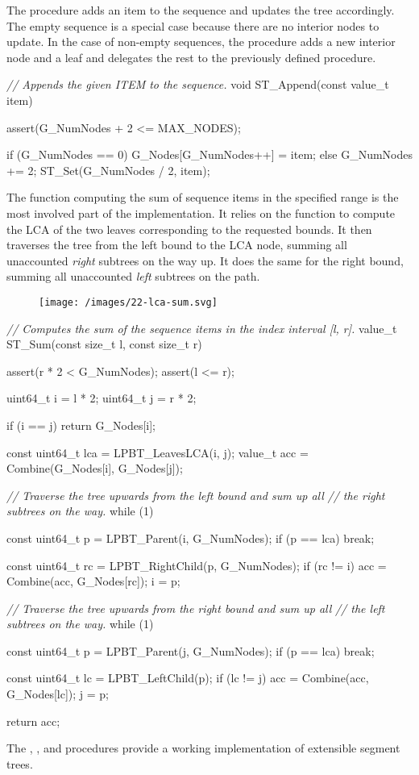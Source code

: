 \documentclass{article}
\begin{document}
The  procedure adds an item to the sequence and updates the tree accordingly.
The empty sequence is a special case because there are no interior nodes to update.
In the case of non-empty sequences, the procedure adds a new interior node and a leaf and delegates the rest to the previously defined  procedure.

\begin{code}[c]
\emph{// Appends the given ITEM to the sequence.}
void ST_Append(const value_t item) {
    assert(G_NumNodes + 2 <= MAX_NODES);

    if (G_NumNodes == 0) {
        G_Nodes[G_NumNodes++] = item;
    } else {
        G_NumNodes += 2;
        ST_Set(G_NumNodes / 2, item);
    }
}
\end{code}

The  function computing the sum of sequence items in the specified range is the most involved part of the implementation.
It relies on the  function to compute the LCA of the two leaves corresponding to the requested bounds.
It then traverses the tree from the left bound to the LCA node, summing all unaccounted \emph{right} subtrees on the way up.
It does the same for the right bound, summing all unaccounted \emph{left} subtrees on the path.

\begin{figure}[grayscale-diagram]
  \texttt{[image: /images/22-lca-sum.svg]}
\end{figure}

\begin{code}[c]
\emph{// Computes the sum of the sequence items in the index interval [l, r].}
value_t ST_Sum(const size_t l, const size_t r) {
    assert(r * 2 < G_NumNodes);
    assert(l <= r);

    uint64_t i = l * 2;
    uint64_t j = r * 2;

    if (i == j) return G_Nodes[i];

    const uint64_t lca = LPBT_LeavesLCA(i, j);
    value_t acc = Combine(G_Nodes[i], G_Nodes[j]);

    \emph{// Traverse the tree upwards from the left bound and sum up all}
    \emph{// the right subtrees on the way.}
    while (1) {
        const uint64_t p = LPBT_Parent(i, G_NumNodes);
        if (p == lca) break;

        const uint64_t rc = LPBT_RightChild(p, G_NumNodes);
        if (rc != i) acc = Combine(acc, G_Nodes[rc]);
        i = p;
    }
    \emph{// Traverse the tree upwards from the right bound and sum up all}
    \emph{// the left subtrees on the way.}
    while (1) {
        const uint64_t p = LPBT_Parent(j, G_NumNodes);
        if (p == lca) break;

        const uint64_t lc = LPBT_LeftChild(p);
        if (lc != j) acc = Combine(acc, G_Nodes[lc]);
        j = p;
    }
    return acc;
}
\end{code}

The , , and  procedures provide a working implementation of extensible segment trees.
\end{document}
